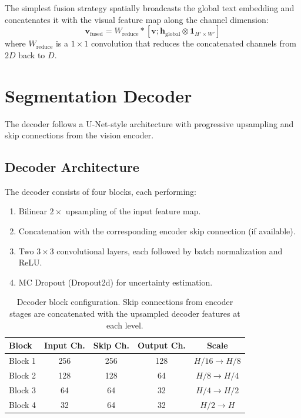 The simplest fusion strategy spatially broadcasts the global text embedding and concatenates it with the visual feature map along the channel dimension:
\begin{equation}
	\mathbf{v}_{\text{fused}} = W_{\text{reduce}} \ast [\mathbf{v}; \mathbf{h}_{\text{global}} \otimes \mathbf{1}_{H' \times W'}]
\end{equation}
where $W_{\text{reduce}}$ is a $1 \times 1$ convolution that reduces the concatenated channels from $2D$ back to $D$.


\section{Segmentation Decoder}
\label{sec:approach:decoder}

The decoder follows a U-Net-style architecture with progressive upsampling and skip connections from the vision encoder.

\subsection{Decoder Architecture}
\label{sec:approach:decoder_arch}

The decoder consists of four blocks, each performing:
\begin{enumerate}
	\item Bilinear $2\times$ upsampling of the input feature map.
	\item Concatenation with the corresponding encoder skip connection (if available).
	\item Two $3 \times 3$ convolutional layers, each followed by batch normalization and ReLU.
	\item \ac{MC} Dropout (Dropout2d) for uncertainty estimation.
\end{enumerate}

\begin{table}[htbp]
	\caption{Decoder block configuration. Skip connections from encoder stages are concatenated with the upsampled decoder features at each level.}
	\label{tab:decoder_config}
	\centering
	\begin{tabular}{lcccc}
		\toprule
		\textbf{Block} & \textbf{Input Ch.} & \textbf{Skip Ch.} & \textbf{Output Ch.} & \textbf{Scale} \\
		\midrule
		Block 1 & 256  & 256 & 128 & $H/16 \rightarrow H/8$  \\
		Block 2 & 128  & 128 & 64  & $H/8 \rightarrow H/4$   \\
		Block 3 & 64   & 64  & 32  & $H/4 \rightarrow H/2$   \\
		Block 4 & 32   & 64  & 32  & $H/2 \rightarrow H$     \\
		\bottomrule
	\end{tabular}
\end{table}

